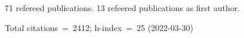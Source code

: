 71 refereed publications. 13 refeered publications as first author.

Total citations~=~2412; h-index~=~25 (2022-03-30)